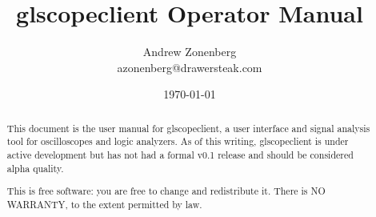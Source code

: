 \documentclass[11pt]{article}
\begin{document}
\title{glscopeclient Operator Manual}
\author{Andrew Zonenberg\\
azonenberg@drawersteak.com}
\date{\today}

\maketitle
\begin{abstract} \normalsize
This document is the user manual for glscopeclient, a user interface and signal analysis tool for oscilloscopes and
logic analyzers. As of this writing, glscopeclient is under active development but has not had a formal v0.1 release
and should be considered alpha quality.

This is free software: you are free to change and redistribute it.
There is NO WARRANTY, to the extent permitted by law.
\end{abstract}
\thispagestyle{empty}

\pagebreak

\tableofcontents

\pagebreak


\pagebreak


\pagebreak


\pagebreak


\pagebreak


\FloatBarrier
\pagebreak


\pagebreak


\pagebreak


\pagebreak

\end{document}
